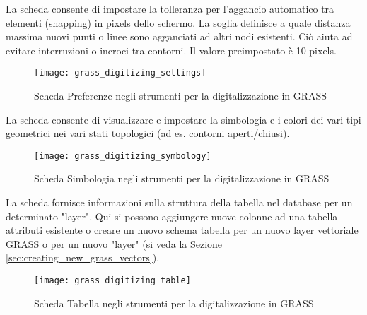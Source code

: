 \label{label_settingtab}

La scheda  consente di impostare la tolleranza per
l'aggancio automatico tra elementi (snapping) in pixels dello schermo. La
soglia definisce a quale distanza massima nuovi punti o linee sono agganciati
ad altri nodi esistenti. Ciò aiuta ad evitare interruzioni o incroci tra
contorni. Il valore preimpostato è 10 pixels.

\begin{figure}[h]
 \begin{center}
 \caption{Scheda Preferenze negli strumenti per la digitalizzazione in GRASS \nixcaption}\label{fig:grass_digitizing_settings}
 \texttt{[image: grass\_digitizing\_settings]}
 \end{center}
\end{figure}


La scheda  consente di visualizzare e impostare la
simbologia e i colori dei vari tipi geometrici nei vari stati topologici (ad
es. contorni aperti/chiusi).

\begin{figure}[h]
 \begin{center}
 \caption{Scheda Simbologia negli strumenti per la digitalizzazione in GRASS \nixcaption}\label{fig:grass_digitizing_symbology}
 \texttt{[image: grass\_digitizing\_symbology]}
 \end{center}
\end{figure}

 

La scheda  fornisce informazioni sulla struttura della tabella
nel database per un determinato "layer". Qui si possono aggiungere nuove
colonne ad una tabella attributi esistente o creare un nuovo schema tabella
per un nuovo layer vettoriale GRASS o per un nuovo "layer" (si veda la Sezione 
\ref{sec:creating_new_grass_vectors}).

\begin{figure}[h]
 \begin{center}
 \caption{Scheda Tabella negli strumenti per la digitalizzazione in GRASS \nixcaption}\label{fig:grass_digitizing_table}
 \texttt{[image: grass\_digitizing\_table]}
 \end{center}
\end{figure}


